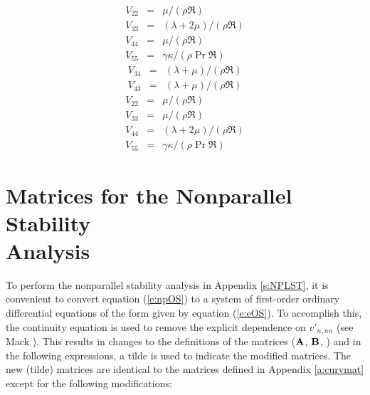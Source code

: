 \pagebreak
{}
%
\begin{eqnarray} 
  V_{22} &=& \mu / (\rho \Re) \\
  V_{33} &=& (\lambda + 2 \mu) / (\rho \Re) \\
  V_{44} &=& \mu / (\rho \Re) \\
  V_{55} &=& \gamma\kappa / (\rho \Pr \Re)
\end{eqnarray}
%
\begin{eqnarray} 
  V_{34} &=& (\lambda + \mu) / (\rho \Re) \\
  V_{43} &=& (\lambda + \mu) / (\rho \Re)
\end{eqnarray}
%
\begin{eqnarray} 
  V_{22} &=& \mu / (\rho \Re) \\
  V_{33} &=& \mu / (\rho \Re) \\
  V_{44} &=& (\lambda + 2 \mu) / (\rho \Re) \\
  V_{55} &=& \gamma\kappa / (\rho \Pr \Re)
\end{eqnarray}

\section[Matrices for the Nonparallel Stability Analysis]{Matrices for the 
Nonparallel Stability \protect\\ Analysis \label{a:NPmat}}

To perform the nonparallel stability analysis in Appendix \ref{s:NPLST}, it is
convenient to convert equation (\ref{e:npOS}) to a system of first-order
ordinary differential equations of the form given by equation (\ref{e:eOS}).
To accomplish this, the continuity equation is used to remove the explicit
dependence on $v'_{n,nn}$ (see Mack \cite{Mack:84a}).  This results in changes
to the definitions of the matrices (${\bf A}$, ${\bf B}$, \etc) and in the following
expressions, a tilde is used to indicate the modified matrices.  The new
(tilde) matrices are identical to the matrices defined in Appendix
\ref{a:curvmat} except for the following modifications:

